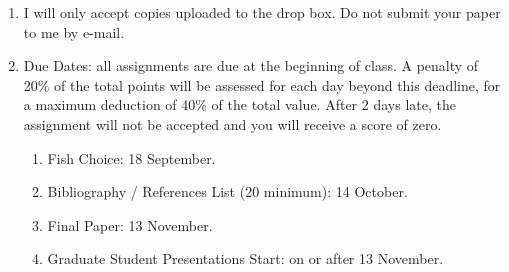 \documentclass[11pt]{article}
\begin{document}
\begin{enumerate}
	\item I will only accept copies uploaded to the drop box.  Do not submit your paper to me by e-mail.

	\item Due Dates: all assignments are due at the beginning of class.  A penalty of 20\% of the total points will be assessed for each day beyond this deadline, for a maximum deduction of 40\% of the total value.  After 2 days late, the assignment will not be accepted and you will receive a score of zero.
	
	\begin{enumerate}[label=\alph*.]
		\item Fish Choice: 18 September.
		\item Bibliography / References List (20 minimum): 14 October.
		\item Final Paper: 13 November.
		\item Graduate Student Presentations Start: on or after 13 November.
	\end{enumerate}
\end{enumerate}
\end{document}
